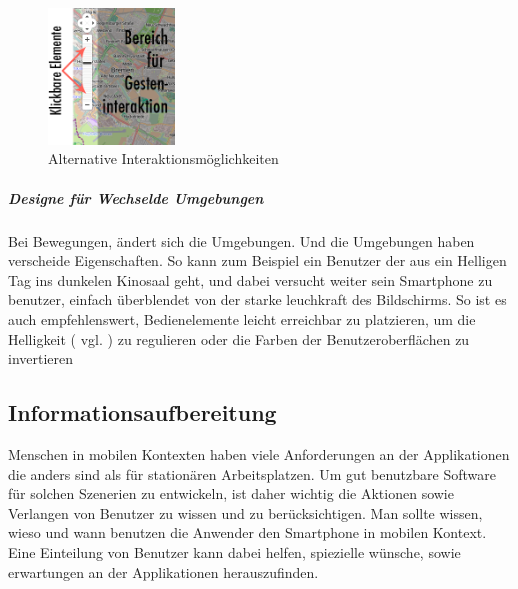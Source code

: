 \begin{figure}
	\begin{center}
	
	\includegraphics[width=0.3\textwidth]{img/NUIbsp.png}
	\caption{Alternative Interaktionsmöglichkeiten}\label{fig:nuibsp}
\end{center}
\end{figure}

\subparagraph{Designe für Wechselde Umgebungen} %
\label{subp:designe_f_r_au_eneinsatz}

Bei Bewegungen, ändert sich die Umgebungen. Und die Umgebungen haben verscheide Eigenschaften. So kann zum Beispiel ein Benutzer der aus ein Helligen Tag ins dunkelen Kinosaal geht, und dabei versucht weiter sein Smartphone zu benutzer, einfach überblendet von der starke leuchkraft des Bildschirms. So ist es auch empfehlenswert, Bedienelemente leicht erreichbar zu platzieren, um die Helligkeit ( vgl. \cite[ff Seite 418]{mobileInteraces}) zu regulieren oder die Farben der Benutzeroberflächen zu invertieren

\subsection{Informationsaufbereitung}
\label{sec:Informationsaufbereitung}


Menschen in mobilen Kontexten haben viele Anforderungen an der Applikationen die anders sind als für stationären Arbeitsplatzen. Um gut benutzbare Software für solchen Szenerien zu entwickeln, ist daher wichtig die Aktionen sowie Verlangen von Benutzer zu wissen und zu berücksichtigen. Man sollte wissen, wieso und wann benutzen die Anwender den Smartphone in mobilen Kontext. Eine Einteilung von Benutzer kann dabei helfen, spiezielle wünsche, sowie erwartungen an der Applikationen herauszufinden.

